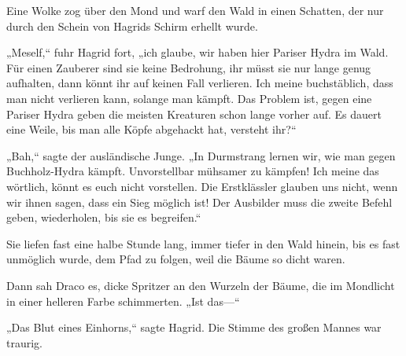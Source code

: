 Eine Wolke zog über den Mond und warf den Wald in einen Schatten, der nur durch den Schein von Hagrids Schirm erhellt wurde.

„Meself,“ fuhr Hagrid fort, „ich glaube, wir haben hier Pariser Hydra im Wald. Für einen Zauberer sind sie keine Bedrohung, ihr müsst sie nur lange genug aufhalten, dann könnt ihr auf keinen Fall verlieren. Ich meine buchstäblich, dass man nicht verlieren kann, solange man kämpft. Das Problem ist, gegen eine Pariser Hydra geben die meisten Kreaturen schon lange vorher auf. Es dauert eine Weile, bis man alle Köpfe abgehackt hat, versteht ihr?“

„Bah,“ sagte der ausländische Junge. „In Durmstrang lernen wir, wie man gegen Buchholz-Hydra kämpft. Unvorstellbar mühsamer zu kämpfen! Ich meine das wörtlich, könnt es euch nicht vorstellen. Die Erstklässler glauben uns nicht, wenn wir ihnen sagen, dass ein Sieg möglich ist! Der Ausbilder muss die zweite Befehl geben, wiederholen, bis sie es begreifen.“

Sie liefen fast eine halbe Stunde lang, immer tiefer in den Wald hinein, bis es fast unmöglich wurde, dem Pfad zu folgen, weil die Bäume so dicht waren.

Dann sah Draco es, dicke Spritzer an den Wurzeln der Bäume, die im Mondlicht in einer helleren Farbe schimmerten.
„Ist das—“

„Das Blut eines Einhorns,“ sagte Hagrid. Die Stimme des großen Mannes war traurig.

